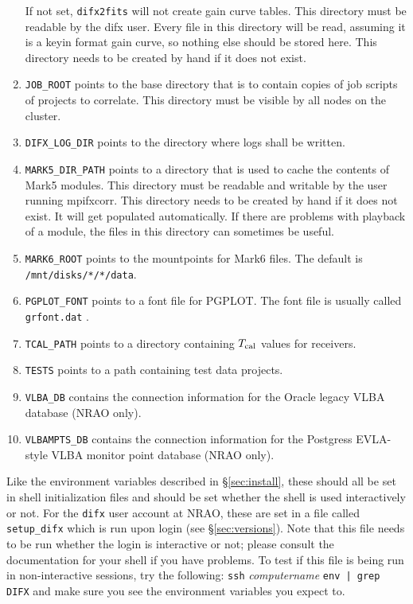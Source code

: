 \begin{enumerate}
If not set, {\tt difx2fits} will not create gain curve tables.
This directory must be readable by the difx user.
Every file in this directory will be read, assuming it is a keyin format gain curve, so nothing else should be stored here.
This directory needs to be created by hand if it does not exist.
\item {\tt JOB\_ROOT} points to the base directory that is to contain copies of job scripts of projects to correlate.
This directory must be visible by all nodes on the cluster.
\item {\tt DIFX\_LOG\_DIR} points to the directory where logs shall be written.
\item {\tt MARK5\_DIR\_PATH} points to a directory that is used to cache the contents of Mark5 modules.
This directory must be readable and writable by the user running mpifxcorr.
This directory needs to be created by hand if it does not exist.  
It will get populated automatically.
If there are problems with playback of a module, the files in this directory can sometimes be useful.
\item {\tt MARK6\_ROOT} points to the mountpoints for Mark6 files.
The default is {\tt /mnt/disks/*/*/data}.
\item {\tt PGPLOT\_FONT} points to a font file for PGPLOT.
The font file is usually called {\tt grfont.dat} .
\item {\tt TCAL\_PATH} points to a directory containing $T_{\rm cal}$ values for receivers.
\item {\tt TESTS} points to a path containing test data projects.
\item {\tt VLBA\_DB} contains the connection information for the Oracle legacy VLBA database (NRAO only).
\item {\tt VLBAMPTS\_DB} contains the connection information for the Postgress EVLA-style VLBA monitor point database (NRAO only).
\end{enumerate}
Like the environment variables described in \S\ref{sec:install}, these should all be set in shell initialization files and should be set whether the shell is used interactively or not.
For the {\tt difx} user account at NRAO, these are set in a file called {\tt setup\_difx} which is run upon login (see \S\ref{sec:versions}).
Note that this file needs to be run whether the login is interactive or not; please consult the documentation for your shell if you have problems.
To test if this file is being run in non-interactive sessions, try the following: {\tt ssh} {\em computername} {\tt env | grep DIFX} and make sure you see the environment variables you expect to.


